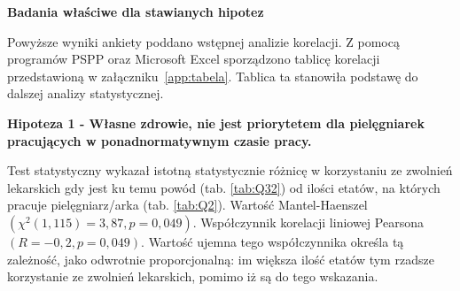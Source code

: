 \documentclass[a4paper,12pt,twoside,openright]{mwrep}
\begin{document}














\vspace{\baselineskip} 


\vspace{\baselineskip} 
\large
\textbf{Badania właściwe dla stawianych hipotez}
\normalsize
\vspace{\baselineskip} 

Powyższe wyniki ankiety poddano wstępnej analizie korelacji. Z pomocą programów PSPP oraz Microsoft Excel sporządzono tablicę korelacji przedstawioną w załączniku~\ref{app:tabela}. Tablica ta stanowiła podstawę do dalszej analizy statystycznej.

\vspace{\baselineskip} 
\textbf{Hipoteza 1 - Własne zdrowie, nie jest priorytetem dla pielęgniarek pracujących w ponadnormatywnym czasie pracy.}
\vspace{\baselineskip} 

Test statystyczny wykazał istotną statystycznie różnicę w korzystaniu ze zwolnień lekarskich gdy jest ku temu powód (tab. \ref{tab:Q32}) od ilości etatów,  na których pracuje pielęgniarz/arka (tab. \ref{tab:Q2}). Wartość Mantel-Haenszel $(\chi^2 (1, 115) = 3,87, p=0,049)$. Współczynnik korelacji liniowej Pearsona $(R = -0,2, p=0,049)$. Wartość ujemna tego współczynnika określa tą zależność, jako odwrotnie proporcjonalną: im większa ilość etatów tym rzadsze korzystanie ze zwolnień lekarskich, pomimo iż są do tego wskazania.
\end{document}

